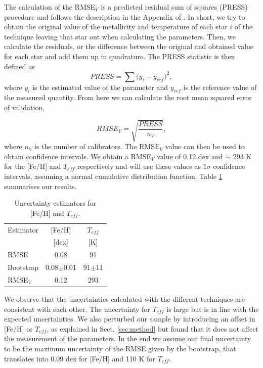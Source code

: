 \documentclass{aa}
\begin{document}
The calculation of the RMSE$_{V}$ is a predicted residual sum of squares (PRESS) procedure \citep{Weisberg-2005} and follows the description in the Appendix of \citet{Rojas-Ayala-2012}. In short, we try to obtain the original value of the metallicity and temperature of each star $i$ of the technique leaving that star out when calculating the parameters. Then, we calculate the residuals, or the difference between the original and obtained value for each star and add them up in quadrature. The PRESS statistic is then defined as 
\begin{equation}
PRESS = \sum{(y_{i}-y_{ref}})^{2},
\end{equation}
where $y_{i}$ is the estimated value of the parameter and $y_{ref}$ is the reference value of the measured quantity. From here we can calculate the root mean squared error of validation,

\begin{equation}
RMSE_{V} = \sqrt{\frac{PRESS}{n_{V}}},
\end{equation}
where $n_{V}$ is the number of calibrators. The RMSE$_{V}$ value can then be used to obtain confidence intervals. We obtain a RMSE$_{V}$ value of 0.12 dex and $\sim$ 293 K for the [Fe/H] and $T_{eff}$ respectively and will use these values as $1\sigma$ confidence intervals, assuming a normal cumulative distribution function. Table \ref{table:errors} summarises our results. 

\begin{table}[h!]
\centering
\caption[]{Uncertainty estimators for [Fe/H] and $T_{eff}$.}
\label{table:errors}
\begin{tabular}{l c c}
\hline
\hline
Estimator & [Fe/H] & $T_{eff}$ \\ 
                &  [dex]  &  [K] \\
\hline
RMSE & 0.08 & 91\\
Bootstrap & 0.08$\pm$0.01 & 91$\pm$11 \\
RMSE$_{V}$ & 0.12 & 293 \\
\hline
\hline
\end{tabular}
\end{table}

We observe that the uncertainties calculated with the different techniques are consistent with each other. The uncertainty for $T_{eff}$ is large but is in line with the expected uncertainties. We also perturbed our sample by introducing an offset in [Fe/H] or $T_{eff}$, as explained in Sect. \ref{sec:method} but found that it does not affect the measurement of the parameters. In the end we assume our final uncertainty to be the maximum uncertainty of the RMSE given by the bootstrap, that translates into 0.09 dex for [Fe/H] and 110 K for $T_{eff}$.   %
\end{document}
